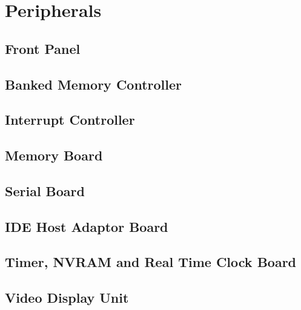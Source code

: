\ifdefined\renderpartperipherals
\part{Peripherals}
  \ifdefined\renderchappfp
    \chapter{Front Panel}
    \glsresetall
    
  \fi

  \ifdefined\renderchapmbu
    \chapter{Banked Memory Controller}
    \glsresetall
  \fi

  \ifdefined\renderchapirc
    \chapter{Interrupt Controller}
    \glsresetall
    
  \fi

  \ifdefined\renderchapmem
    \chapter{Memory Board}
    \glsresetall
    
  \fi

  \ifdefined\renderchaptty
    \chapter{Serial Board}
    \glsresetall
  \fi

  \ifdefined\renderchapide
    \chapter{IDE Host Adaptor Board}
    \glsresetall
  \fi

  \ifdefined\renderchaptnr
    \chapter{Timer, NVRAM and Real Time Clock Board}
    \glsresetall
  \fi

  \ifdefined\renderchapvdu
    \chapter{Video Display Unit}
    \glsresetall
    
  \fi

